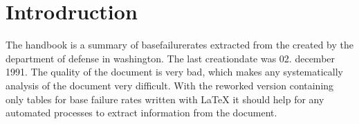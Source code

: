 \chapter{Introdruction}
The handbook is a summary of basefailurerates extracted from the \cite{MIL-HDBK-217F} created by the department of defense in 
washington. The \cite{MIL-HDBK-217F} last creationdate was 02. december 1991. The quality of the document is very bad, which 
makes any systematically analysis of the document very difficult. With the reworked version containing only tables for base failure
rates written with LaTeX it should help for any automated processes to extract information from the document.